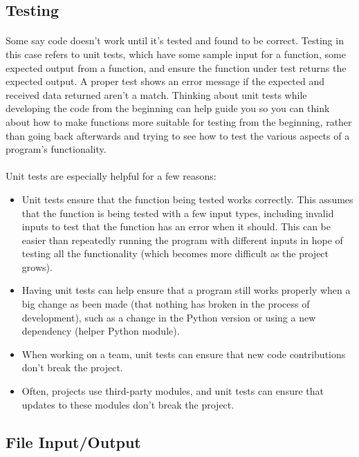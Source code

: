 \documentclass[letter,10pt]{article}
\begin{document}
\subsection{Testing}
\paragraph{}Some say code doesn't work until it's tested and found to be correct. Testing in this case refers to unit tests, which have some sample input for a function, some expected output from a function, and ensure the function under test returns the expected output. A proper test shows an error message if the expected and received data returned aren't a match. Thinking about unit tests while developing the code from the beginning can help guide you so you can think about how to make functions more suitable for testing from the beginning, rather than going back afterwards and trying to see how to test the various aspects of a program's functionality.

\paragraph{}Unit tests are especially helpful for a few reasons:
\begin{itemize}
    \item Unit tests ensure that the function being tested works correctly. This assumes that the function is being tested with a few input types, including invalid inputs to test that the function has an error when it should. This can be easier than repeatedly running the program with different inputs in hope of testing all the functionality (which becomes more difficult as the project grows).
    \item Having unit tests can help ensure that a program still works properly when a big change as been made (that nothing has broken in the process of development), such as a change in the Python version or using a new dependency (helper Python module).
    \item When working on a team, unit tests can ensure that new code contributions don't break the project.
    \item Often, projects use third-party modules, and unit tests can ensure that updates to these modules don't break the project.
\end{itemize}

\subsection{File Input/Output}\label{sec:fileio}
\end{document}
